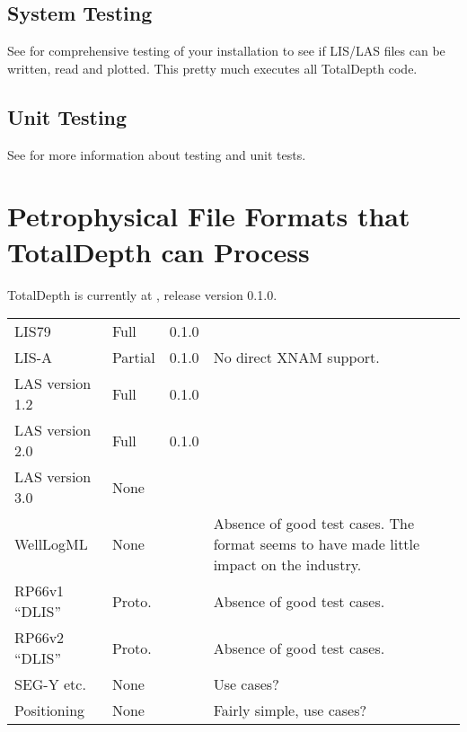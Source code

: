 \documentclass[letterpaper,10pt,english]{sphinxmanual}
\begin{document}
\subsection{System Testing}
\label{\detokenize{installation:system-testing}}
See {\hyperref[\detokenize{testing/test_plot::doc}]{}} for comprehensive testing of your installation to see if LIS/LAS files can be written, read and plotted. This pretty much executes all TotalDepth code.


\subsection{Unit Testing}
\label{\detokenize{installation:unit-testing}}
See {\hyperref[\detokenize{testing/unit_tests::doc}]{}} for more information about testing and unit tests.


\section{Petrophysical File Formats that TotalDepth can Process}
\label{\detokenize{file_formats:petrophysical-file-formats-that-totaldepth-can-process}}\label{\detokenize{file_formats::doc}}\label{\detokenize{file_formats:tarball}}
TotalDepth is currently at , release version 0.1.0.


\begin{savenotes}\sphinxattablestart
\centering
\begin{tabulary}{\linewidth}[t]{|T|T|T|T|}
\hline
{}\relax &\relax &\relax &\relax \\
\hline
LIS79
&
Full
&
0.1.0
&\\
\hline
LIS-A
&
Partial
&
0.1.0
&
No direct XNAM support.
\\
\hline
LAS version 1.2
&
Full
&
0.1.0
&\\
\hline
LAS version 2.0
&
Full
&
0.1.0
&\\
\hline
LAS version 3.0
&
None
&&\\
\hline
WellLogML
&
None
&&
Absence of good test cases.
The format seems to have made little impact on the industry.
\\
\hline
RP66v1 “DLIS”
&
Proto.
&&
Absence of good test cases.
\\
\hline
RP66v2 “DLIS”
&
Proto.
&&
Absence of good test cases.
\\
\hline
SEG-Y etc.
&
None
&&
Use cases?
\\
\hline
Positioning
&
None
&&
Fairly simple, use cases?
\\
\hline
\end{tabulary}
\par
\sphinxattableend\end{savenotes}
\end{document}

